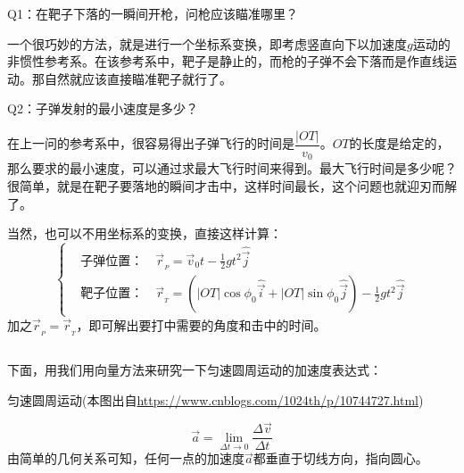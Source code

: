 Q1：在靶子下落的一瞬间开枪，问枪应该瞄准哪里？

一个很巧妙的方法，就是进行一个坐标系变换，即考虑竖直向下以加速度$g$运动的非惯性参考系。在该参考系中，靶子是静止的，而枪的子弹不会下落而是作直线运动。那自然就应该直接瞄准靶子就行了。

Q2：子弹发射的最小速度是多少？

在上一问的参考系中，很容易得出子弹飞行的时间是$\dfrac{|OT|}{v_{0}}$。$OT$的长度是给定的，那么要求的最小速度，可以通过求最大飞行时间来得到。最大飞行时间是多少呢？很简单，就是在靶子要落地的瞬间才击中，这样时间最长，这个问题也就迎刃而解了。

当然，也可以不用坐标系的变换，直接这样计算：
\[\left\{
    \begin{aligned}
         & \text{子弹位置：} \quad \vec{r}_{_P}=\vec{v}_{0}t - \frac{1}{2}gt^{2}\hat{\vec{j}}                                                             \\
         & \text{靶子位置：} \quad \vec{r}_{_T}=\left(|OT|\cos\phi_{0}\hat{\vec{i}} + |OT|\sin\phi_{0}\hat{\vec{j}}\right) - \frac{1}{2}gt^2\hat{\vec{j}}
    \end{aligned}
    \right.\]
加之$\vec{r}_{_P}=\vec{r}_{_T}$，即可解出要打中需要的角度和击中的时间。

\subsection[匀速圆周运动]{}
下面，用我们用向量方法来研究一下匀速圆周运动的加速度表达式：

\vspace*{2ex}
\begin{minipage}{0.9\textwidth}
    \begin{minipage}{0.6\linewidth}
        \begin{center}

            匀速圆周运动(本图出自\url{https://www.cnblogs.com/1024th/p/10744727.html})
        \end{center}
    \end{minipage}
    \quad
    \begin{minipage}{0.35\linewidth}
        \[\vec{a}=\lim_{\Delta t \to 0} \frac{\Delta \vec{v}}{\Delta t}\]
        由简单的几何关系可知，任何一点的加速度$\vec{a}$都垂直于切线方向，指向圆心。
    \end{minipage}
\end{minipage}
\vspace*{2ex}

